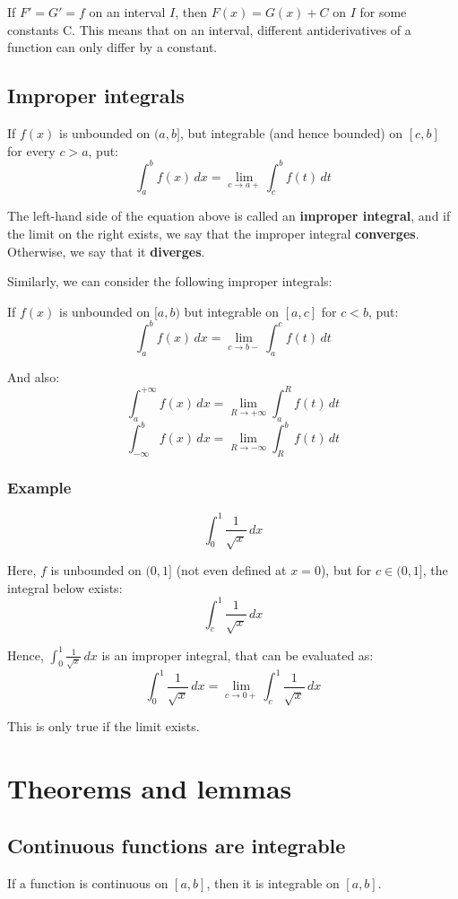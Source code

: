 \documentclass[11pt]{article}
\begin{document}
If \(F' = G' = f\) on an interval \(I\), then \(F(x) = G(x) + C\) on \(I\) for some constants C. This means that on an interval, different antiderivatives of a function can only differ by a constant.
\subsection{Improper integrals}
\label{sec:orgf6f69e9}
If \(f(x)\) is unbounded on \((a, b]\), but integrable (and hence bounded) on \([c, b]\) for every \(c > a\), put:
\[\int_a^b f(x) \, dx = \lim_{c \rightarrow a+} \int_c^b f(t) \, dt\]

The left-hand side of the equation above is called an \textbf{improper integral}, and if the limit on the right exists, we say that the improper integral \textbf{converges}. Otherwise, we say that it \textbf{diverges}.


Similarly, we can consider the following improper integrals:


If \(f(x)\) is unbounded on \([a, b)\) but integrable on \([a, c]\) for \(c < b\), put:
\[\int_a^b f(x) \, dx = \lim_{c \rightarrow b-} \int_a^c f(t) \, dt\]

And also:
\[\int_a^{+ \infty} f(x) \, dx = \lim_{R \rightarrow +\infty} \int_a^R f(t) \, dt\]
\[\int_{- \infty}^b f(x) \, dx = \lim_{R \rightarrow - \infty} \int_R^b f(t) \, dt\]

\newpage
\subsubsection{Example}
\label{sec:orgda8a866}
\[\int_0^1 \frac{1}{\sqrt{x}} \, dx\]

Here, \(f\) is unbounded on \((0, 1]\) (not even defined at \(x = 0\)), but for \(c \in (0, 1]\), the integral below exists:
\[\int_c^1 \frac{1}{\sqrt{x}} \, dx\]

Hence, \(\int_0^1 \frac{1}{\sqrt{x}} \, dx\) is an improper integral, that can be evaluated as:
\[\int_0^1 \frac{1}{\sqrt{x}} \, dx = \lim_{c \rightarrow 0+} \int_c^1 \frac{1}{\sqrt{x}} \, dx\]

This is only true if the limit exists.
\section{Theorems and lemmas}
\label{sec:org18abb4a}

\subsection{Continuous functions are integrable}
\label{sec:org45c0a77}
If a function is continuous on \([a, b]\), then it is integrable on \([a, b]\).
\end{document}
